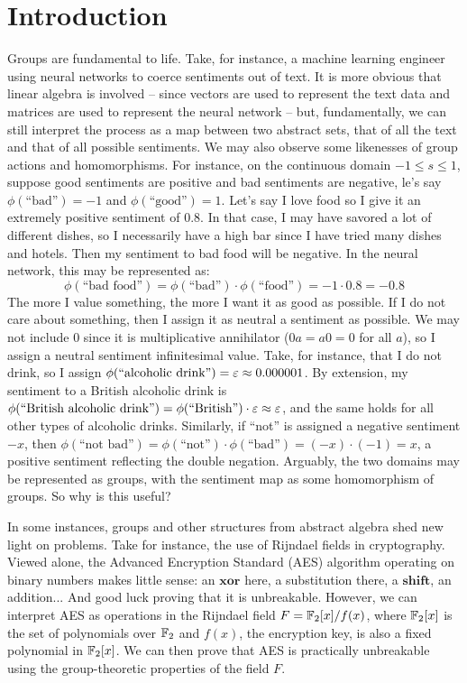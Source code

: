 \section{Introduction}\label{sec:intro}

Groups are fundamental to life.
Take, for instance, a machine learning engineer using
neural networks to coerce sentiments out of text.
It is more obvious that linear algebra is involved --
since vectors are used to represent the text data
and matrices are used to represent the neural network --
but, fundamentally, we can still interpret the process as
a map between two abstract sets, that of all the text
and that of all possible sentiments.
We may also observe some likenesses of group actions and homomorphisms.
For instance, on the continuous domain $-1 \le s \le 1$,
suppose good sentiments are positive and bad sentiments are negative,
le's say $\phi(\text{``bad''}) = -1$ and $\phi(\text{``good''}) = 1$.
Let's say I love food so I give it an extremely positive sentiment of $0.8$.
In that case, I may have savored a lot of different dishes, so I
necessarily have a high bar since I have tried many dishes and hotels.
Then my sentiment to bad food will be negative.
In the neural network, this may be represented as:
\[
  \phi(\text{``bad food''}) = \phi(\text{``bad''}) \cdot \phi(\text{``food''}) = -1 \cdot 0.8 = -0.8
\]
The more I value something, the more I want it as good as possible.
If I do not care about something, then I assign it as neutral a sentiment as possible.
We may not include $0$ since it is
multiplicative annihilator ($0a = a0 = 0$ for all $a$),
so I assign a neutral sentiment infinitesimal value.
Take, for instance, that I do not drink, so I assign $\phi(\text{``alcoholic drink''}) = \varepsilon \approx 0.000001$.
By extension, my sentiment to a British alcoholic drink is
$\phi(\text{``British alcoholic drink''}) = \phi(\text{``British''}) \cdot \varepsilon \approx \varepsilon$,
and the same holds for all other types of alcoholic drinks.
Similarly, if ``not'' is assigned a negative sentiment $-x$,
then $\phi(\text{``not bad''}) = \phi(\text{``not''}) \cdot \phi(\text{``bad''})
= (-x) \cdot (-1) = x$, a positive sentiment reflecting the double negation.
Arguably, the two domains may be represented as groups, with the
sentiment map as some homomorphism of groups.
So why is this useful?

In some instances, groups and other structures from abstract algebra
shed new light on problems.
Take for instance, the use of Rijndael fields in cryptography.
Viewed alone, the Advanced Encryption Standard (AES) algorithm
operating on binary numbers makes little sense:
an $\mathbf{xor}$ here, a substitution there, a $\mathbf{shift}$,
an addition... And good luck proving that it is unbreakable.
However, we can interpret AES as operations in the Rijndael field
$F = \mathbb{F}_2[x]/f(x)$, where $\mathbb{F}_2[x]$ is the set of polynomials over $\mathbb{F}_2$
and $f(x)$, the encryption key, is also a fixed polynomial in $\mathbb{F}_2[x]$.
We can then prove that AES is practically unbreakable 
using the group-theoretic properties of the field $F$.

